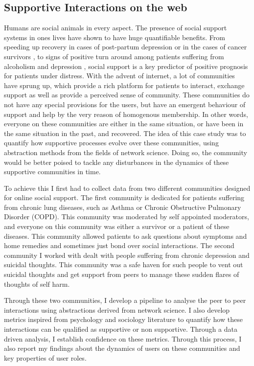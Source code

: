 \subsection{Supportive Interactions on the web}
Humans are social animals in every aspect. The presence of social support systems in ones lives have shown to have huge quantifiable benefits. From speeding up recovery in cases of post-partum depression or in the cases of cancer survivors\cite{collins1993social,dunkel1984social,baron1990social} , to signs of positive turn around among patients suffering from alcoholism and depression \cite{peirce2000longitudinal,brown1986social}, social support is a key predictor of positive prognosis for patients under distress. With the advent of internet, a lot of communities have sprung up, which provide a rich platform for patients to interact, exchange support as well as provide a perceived sense of community. These communities do not have any special provisions for the users, but have an emergent behaviour of support and help by the very reason of homogenous membership. In other words, everyone on these communities are either in the same situation, or have been in the same situation in the past, and recovered. The idea of this case study was to quantify how supportive processes evolve over these communities, using abstraction methods from the fields of network science. Doing so, the community would be better poised to tackle any disturbances in the dynamics of these supportive communities in time. 

To achieve this I first had to collect data from two different communities designed for online social support. The first community is dedicated for patients suffering from chronic lung diseases, such as Asthma or Chronic Obstructive Pulmonary Disorder (COPD). This community was moderated by self appointed moderators, and everyone on this community was either a survivor or a patient of these diseases. This community allowed patients to ask questions about symptoms and home remedies and sometimes just bond over social interactions. The second community I worked with dealt with people suffering from chronic depression and suicidal thoughts. This community was a safe haven for such people to vent out suicidal thoughts and get support from peers to manage these sudden flares of thoughts of self harm. 

Through these two communities, I develop a pipeline to analyse the peer to peer interactions using abstractions derived from network science. I also develop metrics inspired from psychology and sociology literature to quantify how these interactions can be qualified as supportive or non supportive. Through a data driven analysis, I establish confidence on these metrics. Through this process, I also report my findings about the dynamics of users on these communities and key properties of user roles. 

